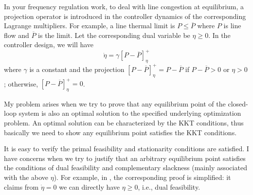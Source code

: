 \documentclass[journal,12pt,onecolumn,draftclsnofoot]{IEEEtran}
\begin{document}






%

%
%


\IEEEpeerreviewmaketitle

In your frequency regulation work, to deal with line congestion at equilibrium, a projection operator is introduced in the controller dynamics of the corresponding Lagrange multipliers. For example, a line thermal limit is $P\le \overline{P}$ where $P$ is line flow and $\overline{P}$ is the limit. Let the corresponding dual variable be $\eta \ge 0$. In the controller design, we will have 
\begin{displaymath}
\dot{\eta}=\gamma \left[  P-\overline{P}\right]^+_\eta
\end{displaymath}
where $\gamma$ is a constant and the projection $\left[  P-\overline{P}\right]^+_\eta= P-\overline{P}$ if $P-\overline{P} >0$ or $\eta>0$; otherwise, $\left[  P-\overline{P}\right]^+_\eta=0$.

My problem arises when we try to prove that any equilibrium point of the closed-loop system is also an optimal solution to the specified underlying optimization problem. An optimal solution can be characterized by the KKT conditions, thus basically we need to show any equilibrium point satisfies the KKT conditions. 

It is easy to verify the primal feasibility and stationarity conditions are satisfied. I have concerns when we try to justify that an arbitrary equilibrium point satisfies the conditions of dual feasibility and complementary slackness (mainly associated with the above $\eta$). For example, in \cite{mallada2017optimal}, the corresponding proof is simplified: it claims from $\dot{\eta}=0$ we can directly have $\eta \ge 0$, i.e., dual feasibility. 
\end{document}
